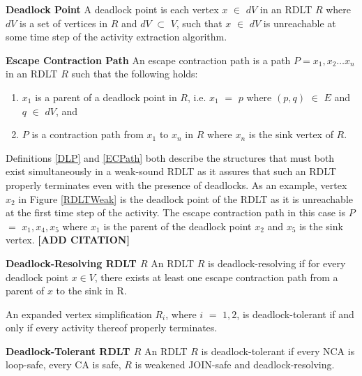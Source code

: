 \begin{defn}\textbf{Deadlock Point}
    \label{DLP}
    A deadlock point is each vertex $ x $ $ \in $ $ dV $ in an RDLT $ R $ where $ dV $ is a set of vertices in $ R $ and $ dV $ $ \subset $ $ V $, such that $ x $ $ \in $ $ dV $ is unreachable at some time step of the activity extraction algorithm.
\end{defn}

\begin{defn}\textbf{Escape Contraction Path}
    \label{ECPath}
    An escape contraction path is a path $ P = x_1, x_2 \ldots x_n $ in an RDLT $ R $ such that the following holds:
    \begin{enumerate}
        \item $ x_1 $ is a parent of a deadlock point in $ R $, i.e. $ x_1 $ $ = $ $ p $ where $ (p,q) $ $ \in $ $ E $ and $ q $ $ \in $ $ dV $, and
        \item $ P $ is a contraction path from $ x_1 $ to $ x_n $ in $ R $ where $ x_n $ is the sink vertex of $ R $.
    \end{enumerate}
\end{defn}

Definitions \ref{DLP} and \ref{ECPath} both describe the structures that must both exist simultaneously in a weak-sound RDLT as it assures that such an RDLT properly terminates even with the presence of deadlocks. As an example, vertex $ x_2 $ in Figure \ref{RDLTWeak} is the deadlock point of the RDLT as it is unreachable at the first time step of the activity. The escape contraction path in this case is $ P $ $ = $ $ x_1, x_4, x_5 $ where $ x_1 $ is the parent of the deadlock point $ x_2 $ and $ x_5 $ is the sink vertex.
 \textbf{[ADD CITATION]}
\begin{defn}\textbf{Deadlock-Resolving RDLT $ R $}
    \label{DLResolving}
    An RDLT $ R $ is deadlock-resolving if for every deadlock point $ x \in V $, there exists at least one escape contraction path from a parent of $ x $ to the sink in R.
\end{defn}

\begin{lem}
    An expanded vertex simplification $ R_i $, where $ i $ $ = $ $ 1, 2 $, is deadlock-tolerant if and only if every activity thereof properly terminates.
\end{lem}

\begin{defn}\textbf{Deadlock-Tolerant RDLT $ R $}
    An RDLT $ R $ is deadlock-tolerant if every NCA is loop-safe, every CA is safe, $ R $ is weakened JOIN-safe and deadlock-resolving.
\end{defn}

